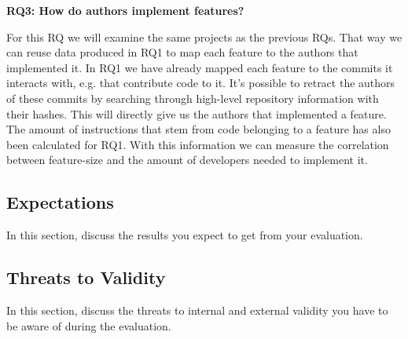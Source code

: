 \textbf{RQ3: How do authors implement features?}

For this RQ we will examine the same projects as the previous RQs.
That way we can reuse data produced in RQ1 to map each feature to the authors that implemented it.
In RQ1 we have already mapped each feature to the commits it interacts with, e.g. that contribute code to it.
It's possible to retract the authors of these commits by searching through high-level repository information with their hashes.
This will directly give us the authors that implemented a feature.
The amount of instructions that stem from code belonging to a feature has also been calculated for RQ1.
With this information we can measure the correlation between feature-size and the amount of developers needed to implement it.

\subsection*{Expectations}\label{sec:expectations}

In this section, discuss the results you expect to get from your evaluation.

\subsection*{Threats to Validity}\label{sec:threats}

In this section, discuss the threats to internal and external validity you have to be aware of during the evaluation.
